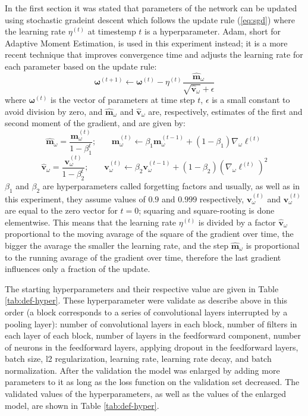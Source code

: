 \documentclass[12pt]{article}
\newcommand{\vect}[1]{\boldsymbol{#1}}
\begin{document}
In the first section it was stated that parameters of the network can be updated using stochastic gradeint descent which follows the update rule (\ref{eq:sgd}) where the learning rate $\eta^{(t)}$ at timestemp $t$ is a hyperparameter. Adam, short for Adaptive Moment Estimation, is used in this experiment instead; it is a more recent technique that improves convergence time and adjusts the learning rate for each parameter based on the update rule:
$$
\vect{\omega}^{(t+1)}\leftarrow \vect{\omega}^{(t)}-\eta^{(t)} {\frac {\vect{{\hat {m}}}_{\omega}}{{\sqrt {\vect{{\hat {v}}}_{\omega}}}+\epsilon }}
$$
where $\vect{\omega}^{(t)}$ is the vector of parameters at time step $t$, $\epsilon$ is a small constant to avoid division by zero, and	 $\vect{{\hat {m}}}_{\omega}$ and $\vect{{\hat {v}}}_{\omega}$ are, respectively, estimates of the first and second moment of the gradient, and are given by:
$$
\vect{\hat {m}}_{\omega}={\frac {\vect{m}_{\omega}^{(t)}}{1-\beta _{1}^{t}}} \text{;}\qquad
\vect{m}_{\omega}^{(t)}\leftarrow \beta _{1}\vect{m}_{\omega}^{(t-1)}+(1-\beta _{1})\nabla _{\omega}\ell^{(t)}
$$
$$
\vect{\hat {v}}_{\omega}={\frac {\vect{v}_{\omega}^{(t)}}{1-\beta _{2}^{t}}} \text{;}\qquad
\vect{v}_{\omega}^{(t)}\leftarrow \beta _{2}\vect{v}_{\omega}^{(t-1)}+(1-\beta _{2})(\nabla _{\omega}\ell^{(t)})^2
$$
$\beta_{1}$ and $\beta_{2}$ are hyperparameters called forgetting factors and usually, as well as in this experiment, they assume values of $0.9$ and $0.999$ respectively, $ \vect{v}_{\omega}^{(t)}$ and $ \vect{v}_{\omega}^{(t)}$ are equal to the zero vector for $t=0$; squaring and square-rooting is done elementwise. This means that the learning rate $\eta^{(t)}$ is divided by a factor $\vect{\hat {v}}_{\omega}$ proportional to the moving avarage of the square of the gradient over time, the bigger the avarage the smaller the learning rate, and the step $\vect{\hat {m}}_{\omega}$ is proportional to the running avarage of the gradient over time, therefore the last gradient influences only a fraction of the update.

The starting hyperparameters and their respective value are given in Table \ref{tab:def-hyper}. These hyperparameter were validate as describe above in this order (a block corresponds to a series of convolutional layers interrupted by a pooling layer): number of convolutional layers in each block, number of filters in each layer of each block, number of layers in the feedforward component, number of neurons in the feedforward layers, applying dropout in the feedforward layers, batch size, l2 regularization, learning rate, learning rate decay, and batch normalization. After the validation the model was enlarged by adding more parameters to it as long as the loss function on the validation set decreased. The validated values of the hyperparameters, as well as the values of the enlarged model, are shown in Table \ref{tab:def-hyper}.
\end{document}
